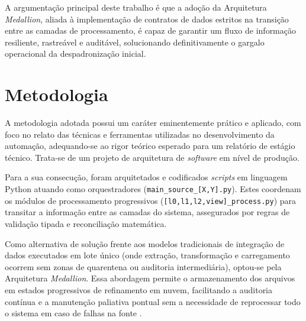 A argumentação principal deste trabalho é que a adoção da Arquitetura \textit{Medallion}, aliada à implementação de contratos de dados estritos na transição entre as camadas de processamento, é capaz de garantir um fluxo de informação resiliente, rastreável e auditável, solucionando definitivamente o gargalo operacional da despadronização inicial.

\section{Metodologia}
A metodologia adotada possui um caráter eminentemente prático e aplicado, com foco no relato das técnicas e ferramentas utilizadas no desenvolvimento da automação, adequando-se ao rigor teórico esperado para um relatório de estágio técnico. Trata-se de um projeto de arquitetura de \textit{software} em nível de produção. 

Para a sua consecução, foram arquitetados e codificados \textit{scripts} em linguagem Python atuando como orquestradores (\texttt{main\_source\_[X,Y].py}). Estes coordenam os módulos de processamento progressivos (\texttt{[l0,l1,l2,view]\_process.py}) para transitar a informação entre as camadas do sistema, assegurados por regras de validação tipada e reconciliação matemática.

Como alternativa de solução frente aos modelos tradicionais de integração de dados executados em lote único (onde extração, transformação e carregamento ocorrem sem zonas de quarentena ou auditoria intermediária), optou-se pela Arquitetura \textit{Medallion}. Essa abordagem permite o armazenamento dos arquivos em estados progressivos de refinamento em nuvem, facilitando a auditoria contínua e a manutenção paliativa pontual sem a necessidade de reprocessar todo o sistema em caso de falhas na fonte \cite{gujjala_medallion}.


